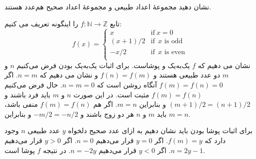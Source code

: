 
نشان دهید مجموعهٔ اعداد طبیعی و مجموعهٔ اعداد صحیح هم‌عدد هستند.
\begin{ans}
    تابع 
    $f:\mathbb{N}\to\mathbb{Z}$
    را اینگونه تعریف می کنیم:
    \[
    f(x) = 
    \begin{cases}
        x & \text{if} \ x = 0\\
        (x+1)/2 & \text{if} \ \ x \text{ is odd}\\
        -x/2 & \text{if} \ \ x \text{ is even}\\
    \end{cases}
    \]
    نشان می دهیم که 
    $f$
    یک‌به‌یک و پوشاست. برای اثبات یک‌به‌یک بودن فرض می‌کنیم
    $n$
    و
    $m$
    دو عدد طبیعی هستند و 
    $f(n) = f(m)$
    و نشان می دهیم که 
    $n = m$.
    اگر 
    $f(m)=f(n) = 0$
    آنگاه روشن است که
    $n = m = 0$.
    حال فرض می‌کنیم $f(m)=f(n)$ مثبت است.
    در این صورت $n$ و $m$ باید فرد باشند و
    $(m+1)/2=(n+1)/2$
    و بنابراین
    $m=n$.
    اگر هم
    $f(m)=f(n)$
    منفی باشد، باید
    $m$
    و
    $n$
    هر دو زوج باشند و
    $-m/2=-n/2$
    و بنابراین
    $m=n$.

    برای اثبات پوشا بودن باید نشان دهیم به ازای عدد صحیح دلخواه
    $y$
    عدد طبیعی
    $n$
    وجود دارد که 
    $f(m) = y$.
    اگر
    $y = 0$
    قرار می‌دهیم
    $n=0$.
    اگر
    $y>0$
    قرار می‌دهیم
    $n=2y-1$.
    اگر
    $y<0$
    قرار می‌دهیم
    $n=-2y$.
    در نتیجه
    $f$
    پوشا است.
\end{ans}
